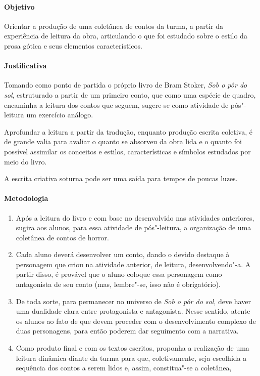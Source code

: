 \documentclass[12pt]{extarticle}
\begin{document}
\paragraph{Objetivo} Orientar a produção de uma coletânea de contos da turma, a partir 
da experiência de leitura da obra, articulando o que foi estudado sobre o estilo da prosa 
gótica e seus elementos característicos. 

\paragraph{Justificativa} Tomando como ponto de partida o próprio livro de Bram Stoker, 
\textit{Sob o pôr do sol}, estruturado a partir de um primeiro conto, que como uma 
espécie de quadro, encaminha a leitura dos contos que seguem, sugere-se como atividade de pós"-leitura 
um exercício análogo. 

Aprofundar a leitura a partir da tradução, enquanto produção escrita coletiva, é de grande valia
para avaliar o quanto se absorveu da obra lida e o quanto foi possível assimilar os conceitos e 
estilos, características e símbolos estudados por meio do livro. 

A escrita criativa soturna pode ser uma saída para tempos de poucas luzes. 

\paragraph{Metodologia}

\begin{enumerate}
\item	
Após a leitura do livro e com base no desenvolvido nas atividades
anteriores, sugira aos alunos, para essa atividade de pós"-leitura, a organização de uma coletânea de contos
de horror. 

\item
Cada aluno deverá desenvolver um conto, dando o devido
destaque à personagem que criou na atividade anterior, de leitura, desenvolvendo"-a. A
partir disso, é provável que o aluno coloque essa personagem como
antagonista de seu conto (mas, lembre"-se, isso não é obrigatório).

\item
De toda sorte, para permanecer no universo de \emph{Sob o pôr do sol}, deve haver
uma dualidade clara entre protagonista e antagonista. Nesse sentido,
atente os alunos ao fato de que devem proceder com o desenvolvimento
complexo de duas personagens, para então poderem dar seguimento com a
narrativa. 

\item
Como produto final e com os textos escritos, proponha a realização de uma
leitura dinâmica diante da turma para que, coletivamente, seja escolhida a sequência dos contos a serem lidos 
e, assim, constitua"-se a coletânea, 

\end{enumerate}
\end{document}
